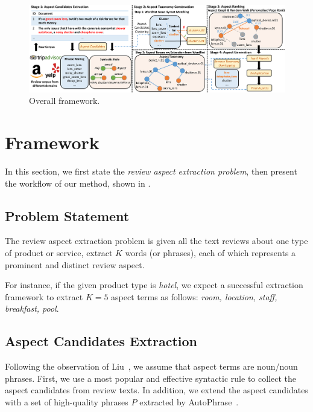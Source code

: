 \begin{figure}[th!]
	\centering
	\includegraphics[width=\textwidth]{figures/framework}
	\caption{Overall framework.}
	\label{fig:framework}
\end{figure}
\section{Framework}
\label{sec:method}
In this section, we first state the \textit{review aspect extraction problem}, 
then present the workflow of our method, shown in .

\subsection{Problem Statement}
\label{sec:problem}
The review aspect extraction problem is given all the text reviews about
one type of product or service, extract $K$ words (or phrases), 
each of which represents a prominent and distinct review aspect. 

For instance, if the given product type is \textit{hotel}, 
we expect a successful extraction framework to extract 
$K=5$ aspect terms as follows: 
\textit{room, location, staff, breakfast, pool}.

\subsection{Aspect Candidates Extraction}
\label{sec:candidate}
Following the observation of Liu~, 
we assume that aspect terms are noun/noun phrases.  
First, we use a most popular and 
effective syntactic rule to collect the aspect candidates 
from review texts.
In addition, we extend the aspect candidates with a set of 
high-quality phrases $P$
extracted by AutoPhrase~\cite{liu2017phrase}.

